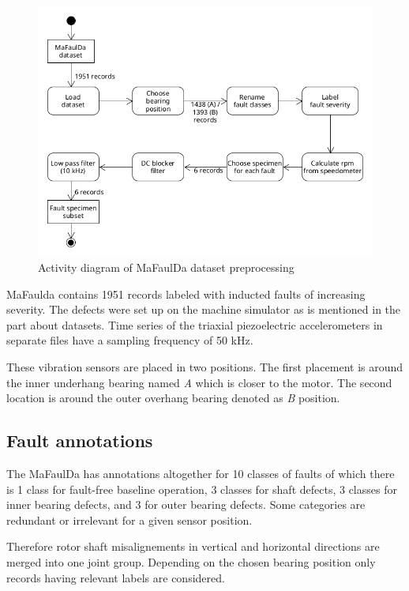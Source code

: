 \begin{figure}[ht]
	\centering
	\includegraphics[width=\textwidth]{assets/design/activity-data-exploration.png}
	\caption{Activity diagram of MaFaulDa dataset preprocessing}
	\label{fig:design:mafaulda-preprocessing}
\end{figure}

MaFaulda contains 1951 records labeled with inducted faults of increasing severity. The defects were set up on the machine simulator as is mentioned in the part about datasets. Time series of the triaxial piezoelectric accelerometers in separate files have a sampling frequency of 50 kHz. 

These vibration sensors are placed in two positions. The first placement is around the inner underhang bearing named \emph{A} which is closer to the motor. The second location is around the outer overhang bearing denoted as \emph{B} position.

\subsection{Fault annotations}
The MaFaulDa has annotations altogether for 10 classes of faults of which there is 1 class for fault-free baseline operation, 3 classes for shaft defects, 3 classes for inner bearing defects, and 3 for outer bearing defects. Some categories are redundant or irrelevant for a given sensor position. 

Therefore rotor shaft misalignements in vertical and horizontal directions are merged into one joint group. Depending on the chosen bearing position only records having relevant labels are considered. 


